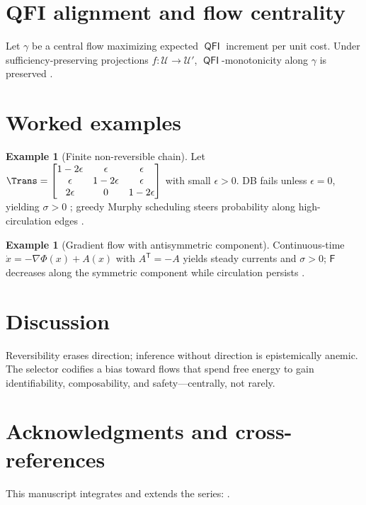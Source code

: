 \documentclass[11pt]{article}
\theoremstyle{plain}
\theoremstyle{definition}
\newtheorem{example}[theorem]{Example}
\theoremstyle{remark}
\DeclareMathOperator{\QFI}{\mathsf{QFI}}
\newcommand{\1}{\mathds{1}}
\newcommand{\U}{\mathcal{U}}
\newcommand{\Free}{\mathsf{F}}
\newcommand{\EP}{\sigma} %
\newcommand{\transpose}{\mathsf{T}}
\begin{document}
\section{QFI alignment and flow centrality}
Let $\gamma$ be a central flow maximizing expected $\QFI$ increment per unit cost. Under sufficiency-preserving projections $f:\U\to\U'$, $\QFI$-monotonicity along $\gamma$ is preserved \cite{AmariNagaoka2000,Petz2002,FlowCentrality2025,IdiomProjections2025}.

\section{Worked examples}
\begin{example}[Finite non-reversible chain]
Let $\Trans=\begin{bmatrix}1-2\epsilon & \epsilon & \epsilon\\ \epsilon & 1-2\epsilon & \epsilon\\ 2\epsilon & 0 & 1-2\epsilon\end{bmatrix}$ with small $\epsilon>0$. DB fails unless $\epsilon=0$, yielding $\EP>0$ \cite{Schnakenberg1976}; greedy Murphy scheduling steers probability along high-circulation edges \cite{Nemhauser1978}.
\end{example}

\begin{example}[Gradient flow with antisymmetric component]
Continuous-time $\dot{x}=-\nabla\Phi(x)+A(x)$ with $A^\transpose=-A$ yields steady currents and $\EP>0$; $\Free$ decreases along the symmetric component while circulation persists \cite{Seifert2012,JordanKinderlehrerOtto1998}.
\end{example}

\section{Discussion}
Reversibility erases direction; inference without direction is epistemically anemic. The selector codifies a bias toward flows that spend free energy to gain identifiability, composability, and safety—centrally, not rarely.

\section*{Acknowledgments and cross-references}
This manuscript integrates and extends the series: \cite{QFI2025,IdiomProjections2025,ModalShell2025,ErgodicDrift2025,MurphyBudget2025,FlowCentrality2025,GradedEffects2025,MeasureContracts2025,FromSetsToQuotientFlows2025,BAFRC2025,TemperamentPolicy2025,LeafModeProtocol2025,InversionGuardrail2025,EcologicalMotionPerception2025}.


\end{document}
